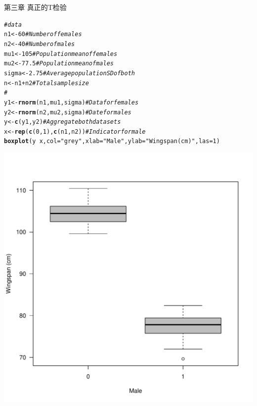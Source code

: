 \documentclass{article}\usepackage[]{graphicx}\usepackage[]{color}
\makeatletter
\def\maxwidth{ %
  \ifdim\Gin@nat@width>\linewidth
    \linewidth
  \else
    \Gin@nat@width
  \fi
}
\newcommand{\hlnum}[1]{\textcolor[rgb]{0.686,0.059,0.569}{#1}}%
\newcommand{\hlstr}[1]{\textcolor[rgb]{0.192,0.494,0.8}{#1}}%
\newcommand{\hlcom}[1]{\textcolor[rgb]{0.678,0.584,0.686}{\textit{#1}}}%
\newcommand{\hlopt}[1]{\textcolor[rgb]{0,0,0}{#1}}%
\newcommand{\hlstd}[1]{\textcolor[rgb]{0.345,0.345,0.345}{#1}}%
\newcommand{\hlkwb}[1]{\textcolor[rgb]{0.69,0.353,0.396}{#1}}%
\newcommand{\hlkwc}[1]{\textcolor[rgb]{0.333,0.667,0.333}{#1}}%
\newcommand{\hlkwd}[1]{\textcolor[rgb]{0.737,0.353,0.396}{\textbf{#1}}}%
\newenvironment{kframe}{%
 \def\at@end@of@kframe{}%
 \ifinner\ifhmode%
  \def\at@end@of@kframe{\end{minipage}}%
  \begin{minipage}{\columnwidth}%
 \fi\fi%
 \def\FrameCommand##1{\hskip\@totalleftmargin \hskip-\fboxsep
 \colorbox{shadecolor}{##1}\hskip-\fboxsep
     \hskip-\linewidth \hskip-\@totalleftmargin \hskip\columnwidth}%
 \MakeFramed {\advance\hsize-\width
   \@totalleftmargin\z@ \linewidth\hsize
   \@setminipage}}%
 {\par\unskip\endMakeFramed%
 \at@end@of@kframe}
\newenvironment{knitrout}{}{} %
\makeatother
\begin{document}
第三章  真正的T检验
\begin{knitrout}
\color{fgcolor}\begin{kframe}
\begin{alltt}
\hlcom{# data ~~~~~~~~~~~~~~~~~~}
\hlstd{n1} \hlkwb{<-} \hlnum{60}  \hlcom{# Number of females}
\hlstd{n2} \hlkwb{<-} \hlnum{40}  \hlcom{# Number of males}
\hlstd{mu1} \hlkwb{<-} \hlnum{105}  \hlcom{# Population mean of females}
\hlstd{mu2} \hlkwb{<-} \hlnum{77.5}  \hlcom{# Population mean of males}
\hlstd{sigma} \hlkwb{<-} \hlnum{2.75}  \hlcom{# Average population SD of both}
\hlstd{n} \hlkwb{<-} \hlstd{n1} \hlopt{+} \hlstd{n2}  \hlcom{# Total sample size}
\hlcom{# }
\hlstd{y1} \hlkwb{<-} \hlkwd{rnorm}\hlstd{(n1, mu1, sigma)}  \hlcom{# Data for females}
\hlstd{y2} \hlkwb{<-} \hlkwd{rnorm}\hlstd{(n2, mu2, sigma)}  \hlcom{# Date for males}
\hlstd{y} \hlkwb{<-} \hlkwd{c}\hlstd{(y1, y2)}  \hlcom{# Aggregate both data sets}
\hlstd{x} \hlkwb{<-} \hlkwd{rep}\hlstd{(}\hlkwd{c}\hlstd{(}\hlnum{0}\hlstd{,} \hlnum{1}\hlstd{),} \hlkwd{c}\hlstd{(n1, n2))}  \hlcom{# Indicator for male}
\hlkwd{boxplot}\hlstd{(y} \hlopt{~} \hlstd{x,} \hlkwc{col} \hlstd{=} \hlstr{"grey"}\hlstd{,} \hlkwc{xlab} \hlstd{=} \hlstr{"Male"}\hlstd{,} \hlkwc{ylab} \hlstd{=} \hlstr{"Wingspan (cm)"}\hlstd{,} \hlkwc{las} \hlstd{=} \hlnum{1}\hlstd{)}
\end{alltt}
\end{kframe}
\includegraphics[width=\maxwidth]{figure/unnamed-chunk-121} 

\end{knitrout}
\end{document}
